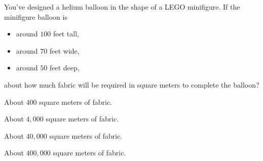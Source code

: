 \documentclass{../ximera}
\begin{document}
\begin{exercise}
You've designed a helium balloon in the shape of a
LEGO minifigure. If the minifigure balloon is
\begin{itemize}
\item around $100$ feet tall,
\item around $70$ feet wide,
\item around $50$ feet deep, 
\end{itemize}
about how much fabric will be required in square meters to complete
the balloon?
\begin{enumerate}\begin{multicols}{2}
  \item About $400$ square meters of fabric.
  \item About $4,000$ square meters of fabric.
  \item About $40,000$ square meters of fabric.
  \item About $400,000$ square meters of fabric.
  \end{multicols}
\end{enumerate}
\end{exercise}






\end{document}
